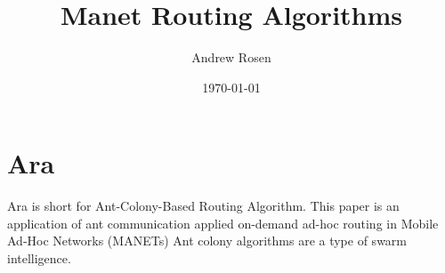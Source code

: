 \documentclass[a4paper]{article}
\title{Manet Routing Algorithms}
\author{Andrew Rosen}
\date{\today}
\begin{document}
\section{Ara}
Ara is short for Ant-Colony-Based Routing Algorithm.
This paper is an application of ant communication applied on-demand ad-hoc routing in Mobile Ad-Hoc Networks (MANETs)
Ant colony algorithms are a type of swarm intelligence.  
\end{document}
